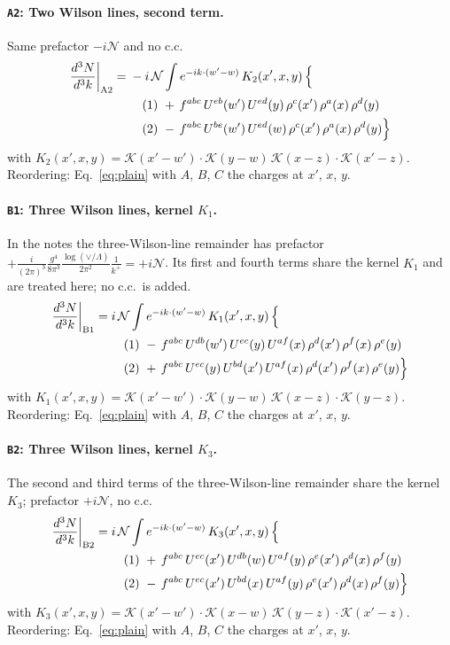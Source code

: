 \documentclass[10pt]{article}
\numberwithin{equation}{section}
\newcommand{\KK}{\mathcal K}
\newcommand{\NN}{\mathcal N}
\newcommand{\lab}[1]{\texttt{#1}}
\begin{document}
\paragraph{\lab{A2}: Two Wilson lines, second term.}
Same prefactor $-i\NN$ and no c.c.
\begin{align}
\frac{d^3N}{d^3k}\bigg|_{\rm A2}={}&-i\,\NN\int e^{-ik\cdot(w'-w)}\,K_2(x',x,y)\,\Big\{\notag\\
&\quad (1)\ +\,f^{abc}\,U^{eb}(w')\,U^{ed}(y)\,\rho^{c}(x')\,\rho^{a}(x)\,\rho^{d}(y)\notag\\
&\quad (2)\ -\,f^{abc}\,U^{be}(w')\,U^{ed}(w)\,\rho^{c}(x')\,\rho^{a}(x)\,\rho^{d}(y)\Big\}\label{eq:in-A2}
\end{align}
with $K_2(x',x,y)=\KK(x'-w')\cdot\KK(y-w)\,\KK(x-z)\cdot\KK(x'-z)$.
Reordering: Eq.~\eqref{eq:plain} with $A$, $B$, $C$ the charges at $x'$, $x$, $y$.
\paragraph{\lab{B1}: Three Wilson lines, kernel $K_1$.}
In the notes the three-Wilson-line remainder has prefactor $+\frac{i}{(2\pi)^3}\frac{g^4}{8\pi^3}\frac{\log(\vee/\Lambda)}{2\pi^2}\frac1{k^+}=+i\NN$. Its first and fourth terms share the kernel $K_1$ and are treated here; no c.c.\ is added.
\begin{align}
\frac{d^3N}{d^3k}\bigg|_{\rm B1}={}&i\,\NN\int e^{-ik\cdot(w'-w)}\,K_1(x',x,y)\,\Big\{\notag\\
&\quad (1)\ -\,f^{abc}\,U^{db}(w')\,U^{ec}(y)\,U^{af}(x)\,\rho^{d}(x')\,\rho^{f}(x)\,\rho^{e}(y)\notag\\
&\quad (2)\ +\,f^{abc}\,U^{ec}(y)\,U^{bd}(x')\,U^{af}(x)\,\rho^{d}(x')\,\rho^{f}(x)\,\rho^{e}(y)\Big\}\label{eq:in-B1}
\end{align}
with $K_1(x',x,y)=\KK(x'-w')\cdot\KK(y-w)\,\KK(x-z)\cdot\KK(y-z)$.
Reordering: Eq.~\eqref{eq:plain} with $A$, $B$, $C$ the charges at $x'$, $x$, $y$.
\paragraph{\lab{B2}: Three Wilson lines, kernel $K_3$.}
The second and third terms of the three-Wilson-line remainder share the kernel $K_3$; prefactor $+i\NN$, no c.c.
\begin{align}
\frac{d^3N}{d^3k}\bigg|_{\rm B2}={}&i\,\NN\int e^{-ik\cdot(w'-w)}\,K_3(x',x,y)\,\Big\{\notag\\
&\quad (1)\ +\,f^{abc}\,U^{ec}(x')\,U^{db}(w)\,U^{af}(y)\,\rho^{e}(x')\,\rho^{d}(x)\,\rho^{f}(y)\notag\\
&\quad (2)\ -\,f^{abc}\,U^{ec}(x')\,U^{bd}(x)\,U^{af}(y)\,\rho^{e}(x')\,\rho^{d}(x)\,\rho^{f}(y)\Big\}\label{eq:in-B2}
\end{align}
with $K_3(x',x,y)=\KK(x'-w')\cdot\KK(x-w)\,\KK(y-z)\cdot\KK(x'-z)$.
Reordering: Eq.~\eqref{eq:plain} with $A$, $B$, $C$ the charges at $x'$, $x$, $y$.
\end{document}
